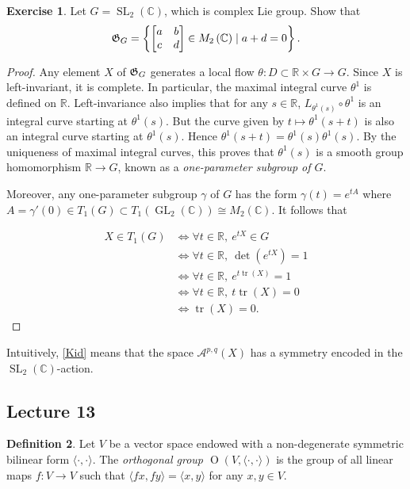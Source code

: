 \documentclass[10pt,letterpaper,cm]{nupset}
\theoremstyle{definition}
\newtheorem{defn}{Definition}[subsection]
\theoremstyle{theorem}
\newtheorem{exercise}[defn]{Exercise}
\theoremstyle{remark}
\newcommand{\A}{\mathcal A}
\newcommand{\C}{\mathbb C}
\newcommand{\G}{\frak{G}}
\newcommand{\R}{\mathbb{R}}
\newcommand{\1}{\mathbb{1}}
\newcommand{\0}{\vec 0}
\DeclareMathOperator{\tr}{tr}
\DeclareMathOperator{\GL}{GL}
\DeclareMathOperator{\SL}{SL}
\DeclareMathOperator{\Or}{O}
\begin{document}
\begin{exercise}
Let $G= \SL_2\left(\C\right)$, which is complex Lie group. Show that $$\G_{G} = \left\{\begin{bmatrix} a & b \\ c & d \end{bmatrix} \in M_2\left(\C\right) \mid a+d =0\right\}.$$
\end{exercise}
\begin{proof}
Any element $X$ of $\G_{G}$ generates a local flow $\theta : D \subset \R \times G \to G$. Since $X$ is left-invariant, it is complete. In particular, the maximal integral curve $\theta^1$ is defined on $\R$.  Left-invariance also implies that for any $s\in \R$, $L_{\theta^1(s)} \circ \theta^1$ is an integral curve starting at $\theta^1(s)$. But the curve given by $t\mapsto \theta^1(s+t)$ is also an integral curve starting at $\theta^1(s)$. Hence $ \theta^1(s+t) = \theta^1(s)\theta^1(s)$. By the uniqueness of maximal integral curves, this proves that $\theta^1(s)$ is a smooth group homomorphism $\R \to G$, known as a \textit{one-parameter subgroup of $G$}. 

\smallskip

Moreover, any one-parameter subgroup $\gamma$ of $G$ has the form  $\gamma(t) = e^{tA}$ where $A = \gamma'(0) \in T_1(G) \subset T_1\left(\GL_2(\C)\right) \cong M_2(\C)$. It follows that 

\begin{align*}
X \in T_1(G)&  \iff \forall{t} \in \R, \  e^{tX} \in G 
\\ & \iff  \forall{t} \in \R, \  \det\left(e^{tX}\right) =1
\\ & \iff  \forall{t} \in \R, \ e^{t\tr(X)} =1
\\ & \iff \forall{t} \in \R, \ t\tr(X) = 0
\\ & \iff \tr(X) =0
. \end{align*}
\end{proof}

Intuitively, \cref{Kid} means that the space $\A^{p,q}\left(X\right)$ has a symmetry encoded in the $\SL_2\left(\C\right)$-action.  

\subsection{Lecture 13}

\begin{defn}
Let $V$ be a vector space endowed with a non-degenerate symmetric bilinear form $\langle \cdot , \cdot \rangle$. The \textit{orthogonal group $\Or\left(V, \langle \cdot , \cdot \rangle\right)$} is the group of all linear maps $f : V \to V$ such that $\langle f{x}, f{y}\rangle = \langle x,y\rangle$ for any $x,y\in V$.
\end{defn}
\end{document}
